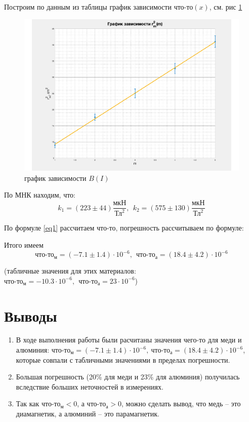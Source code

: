 \documentclass[a4paper,12pt]{article}
\begin{document}
Построим по данным из таблицы график зависимости $\text{что-то}(x)$, см. рис \ref{gr1}

\begin{center}
\begin{figure}[bhtp]
	\centering
	\includegraphics[width=\linewidth]{gr1.pdf}
	\caption{график зависимости $B(I)$}
	\label{gr1}
\end{figure}
\end{center}



По МНК находим, что: \[k_1 = (223 \pm 44)\dfrac{\text{мкН}}{\text{Тл}^2}, \ \ k_2 = (575 \pm 130)\dfrac{\text{мкН}}{\text{Тл}^2}\]


По формуле \eqref{eq1} рассчитаем что-то, погрешность рассчитываем по формуле:

Итого имеем
\[\text{что-то}_{\text{м}} = (-7.1 \pm 1.4) \cdot 10^{-6}, \ \  \text{что-то}_{\text{а}} = (18.4 \pm 4.2) \cdot 10^{-6}\]


(табличные значения для этих материалов: $\text{что-то}_{\text{м}} = -10.3 \cdot 10^{-6}, \ \  \text{что-то}_{\text{а}} = 23 \cdot 10^{-6}$)

\section*{Выводы}
\begin{enumerate}
	\item В ходе выполнения работы были расчитаны значения чего-то для меди и алюминия: $\text{что-то}_{\text{м}} = (-7.1 \pm 1.4) \cdot 10^{-6}, \  \text{что-то}_{\text{а}} = (18.4 \pm 4.2) \cdot 10^{-6}$, которые совпали с табличными значениями в пределах погрешности.
	\item Большая погрешность (20\% для меди и 23\% для алюминия) получилась вследствие больших неточностей в измерениях.
	\item Так как $\text{что-то}_{\text{м}} < 0$, а $\text{что-то}_{\text{а}} > 0$, можно сделать вывод, что медь -- это диамагнетик, а алюминий -- это парамагнетик.
\end{enumerate}
\end{document}

